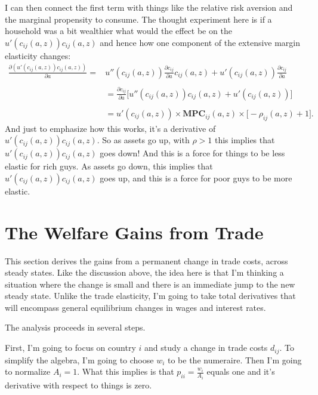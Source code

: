 \documentclass[12pt,pdftex]{article}
\begin{document}
\begin{onehalfspacing}
I can then connect the first term with things like the relative risk aversion and the marginal propensity to consume. The thought experiment here is if a household was a bit wealthier what would the effect be on the $u'(c_{ij}(a,z))c_{ij}(a,z)$ and hence how one component of the extensive margin elasticity changes:
\begin{align}
\frac{\partial (u'(c_{ij}(a,z))c_{ij}(a,z))}{\partial a} =& u''(c_{ij}(a,z))\frac{\partial c_{ij}}{\partial a}c_{ij}(a,z) + u'(c_{ij}(a,z))\frac{\partial c_{ij}}{\partial a} \\
\nonumber \\
&= \frac{\partial c_{ij}}{\partial a}\bigg[u''(c_{ij}(a,z))c_{ij}(a,z) + u'(c_{ij}(a,z)) \bigg] \\
\nonumber\\
&= u'(c_{ij}(a,z))\times \mathbf{MPC}_{ij}(a,z) \times \bigg[-\rho_{ij}(a,z) + 1\bigg]. \label{eq:apx-elasticity-mpc}
\end{align}
And just to emphasize how this works, it's a derivative of $u'(c_{ij}(a,z))c_{ij}(a,z)$. So as assets go up, with $\rho > 1$ this implies that $u'(c_{ij}(a,z))c_{ij}(a,z)$ goes down! And this is a force for things to be less elastic for rich guys. As assets go down, this implies that $u'(c_{ij}(a,z))c_{ij}(a,z)$ goes up, and this is a force for poor guys to be more elastic.

\section{The Welfare Gains from Trade}\label{apx-sec:gains-trade}

This section derives the gains from a permanent change in trade costs, across steady states. Like the discussion above, the idea here is that I'm thinking a situation where the change is small and there is an immediate jump to the new steady state. Unlike the trade elasticity, I'm going to take total derivatives that will encompass general equilibrium changes in wages and interest rates.

The analysis proceeds in several steps.

First, I'm going to focus on country $i$ and study a change in trade costs $d_{ij}$. To simplify the algebra, I'm going to choose $w_i$ to be the numeraire. Then I'm going to normalize $A_i = 1$. What this implies is that $p_{ii} = \frac{w_i}{A_i}$ equals one and it's derivative with respect to things is zero.


\end{onehalfspacing}
\end{document}
